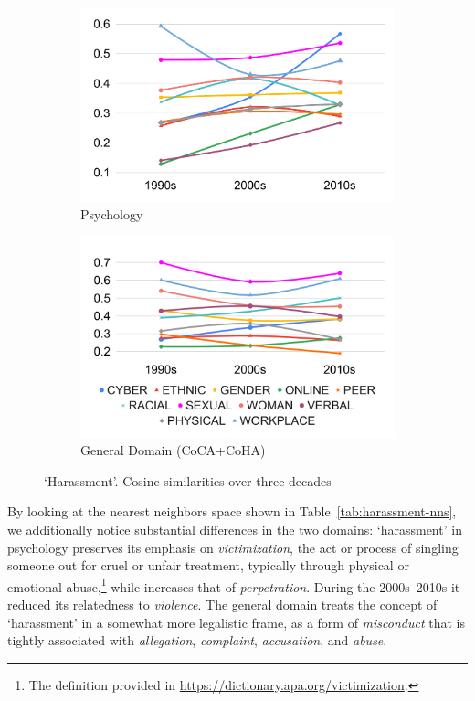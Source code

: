 \documentclass[output=paper]{langsci/langscibook}
\begin{document}
\begin{figure}[H]
  \begin{subfigure}[b]{.5\linewidth}
        \includegraphics[width=\textwidth]{figures/VYLOMOVA_harassment-psych.pdf}
        \caption{Psychology}
        \end{subfigure}\begin{subfigure}[b]{.5\linewidth}
        \includegraphics[width=\textwidth]{figures/VYLOMOVA_harassment-cos-sim-cocha.pdf}
        \caption{General Domain (CoCA+CoHA)}
        \end{subfigure}
 \caption{`Harassment'. Cosine similarities over three decades\label{fig:w2v-cos-sim-harassment}}
\end{figure}

By looking at the nearest neighbors space shown in Table~\ref{tab:harassment-nns}, we additionally notice substantial differences in the two domains: `harassment' in psychology preserves its emphasis on \textit{victimization}, the act or process of singling someone out for cruel or unfair treatment, typically through physical or emotional abuse,\footnote{The definition provided in \url{https://dictionary.apa.org/victimization}.} while increases that of \emph{perpetration}.
During the 2000s--2010s it reduced its relatedness to \textit{violence}. The general domain treats the concept of `harassment' in a somewhat more legalistic frame, as a form of \textit{misconduct} that is tightly associated with \textit{allegation}, \textit{complaint}, \textit{accusation}, and \textit{abuse}. 
\end{document}
